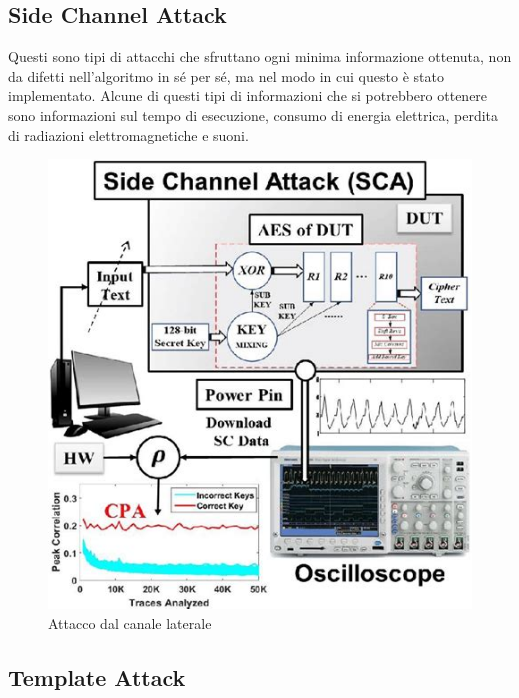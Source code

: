 


\subsection{Side Channel Attack}

 

\textsf{\small Questi sono tipi di attacchi che sfruttano ogni minima informazione ottenuta, non da difetti nell'algoritmo in sé per sé, ma nel modo in cui questo è stato implementato. Alcune di questi tipi di informazioni che si potrebbero ottenere sono informazioni sul tempo di esecuzione, consumo di energia elettrica, perdita di radiazioni elettromagnetiche e suoni.}

\begin{figure}[H]
	\centering
	\includegraphics[width=.6\textwidth, height=.6\textheight, keepaspectratio]{./images/attacks/side_channel_attack.png}
	\caption{Attacco dal canale laterale}
	\label{fig:side_channel_attack}
\end{figure}

\subsection{Template Attack}

   

